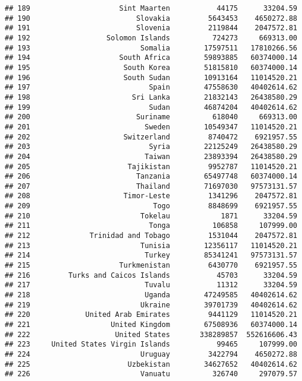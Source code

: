 \documentclass[
]{article}
\begin{document}
\begin{verbatim}
## 189                     Sint Maarten           44175      33204.59
## 190                         Slovakia         5643453    4650272.88
## 191                         Slovenia         2119844    2047572.81
## 192                  Solomon Islands          724273     669313.00
## 193                          Somalia        17597511   17810266.56
## 194                     South Africa        59893885   60374000.14
## 195                      South Korea        51815810   60374000.14
## 196                      South Sudan        10913164   11014520.21
## 197                            Spain        47558630   40402614.62
## 198                        Sri Lanka        21832143   26438580.29
## 199                            Sudan        46874204   40402614.62
## 200                         Suriname          618040     669313.00
## 201                           Sweden        10549347   11014520.21
## 202                      Switzerland         8740472    6921957.55
## 203                            Syria        22125249   26438580.29
## 204                           Taiwan        23893394   26438580.29
## 205                       Tajikistan         9952787   11014520.21
## 206                         Tanzania        65497748   60374000.14
## 207                         Thailand        71697030   97573131.57
## 208                      Timor-Leste         1341296    2047572.81
## 209                             Togo         8848699    6921957.55
## 210                          Tokelau            1871      33204.59
## 211                            Tonga          106858     107999.00
## 212              Trinidad and Tobago         1531044    2047572.81
## 213                          Tunisia        12356117   11014520.21
## 214                           Turkey        85341241   97573131.57
## 215                     Turkmenistan         6430770    6921957.55
## 216         Turks and Caicos Islands           45703      33204.59
## 217                           Tuvalu           11312      33204.59
## 218                           Uganda        47249585   40402614.62
## 219                          Ukraine        39701739   40402614.62
## 220             United Arab Emirates         9441129   11014520.21
## 221                   United Kingdom        67508936   60374000.14
## 222                    United States       338289857  552616606.43
## 223     United States Virgin Islands           99465     107999.00
## 224                          Uruguay         3422794    4650272.88
## 225                       Uzbekistan        34627652   40402614.62
## 226                          Vanuatu          326740     297079.57

\end{verbatim}
\end{document}
